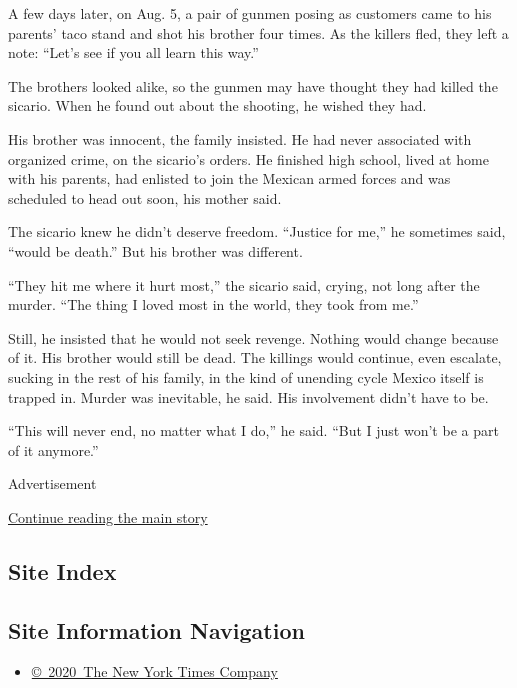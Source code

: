 A few days later, on Aug. 5, a pair of gunmen posing as customers came
to his parents' taco stand and shot his brother four times. As the
killers fled, they left a note: ``Let's see if you all learn this way.''

The brothers looked alike, so the gunmen may have thought they had
killed the sicario. When he found out about the shooting, he wished they
had.

His brother was innocent, the family insisted. He had never associated
with organized crime, on the sicario's orders. He finished high school,
lived at home with his parents, had enlisted to join the Mexican armed
forces and was scheduled to head out soon, his mother said.

The sicario knew he didn't deserve freedom. ``Justice for me,'' he
sometimes said, ``would be death.'' But his brother was different.

``They hit me where it hurt most,'' the sicario said, crying, not long
after the murder. ``The thing I loved most in the world, they took from
me.''

Still, he insisted that he would not seek revenge. Nothing would change
because of it. His brother would still be dead. The killings would
continue, even escalate, sucking in the rest of his family, in the kind
of unending cycle Mexico itself is trapped in. Murder was inevitable, he
said. His involvement didn't have to be.

``This will never end, no matter what I do,'' he said. ``But I just
won't be a part of it anymore.''

Advertisement

\protect\hyperlink{after-bottom}{Continue reading the main story}

\hypertarget{site-index}{%
\subsection{Site Index}\label{site-index}}

\hypertarget{site-information-navigation}{%
\subsection{Site Information
Navigation}\label{site-information-navigation}}

\begin{itemize}
\tightlist
\item
  \href{https://help.nytimes.com/hc/en-us/articles/115014792127-Copyright-notice}{©~2020~The
  New York Times Company}
\end{itemize}

